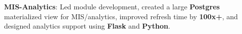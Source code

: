 \documentclass[letterpaper,11pt]{article}
\newcommand{\resumeItem}[2]{
  \item\small{
    \textbf{#1}{: #2 \vspace{-2pt}}
  }
}
\begin{document}
          \resumeItem{MIS-Analytics}
            {Led module development, created a large \textbf{Postgres} materialized view for MIS/analytics, improved refresh time by \textbf{100x+}, and designed analytics support using \textbf{Flask} and \textbf{Python}.}


            
\end{document}
